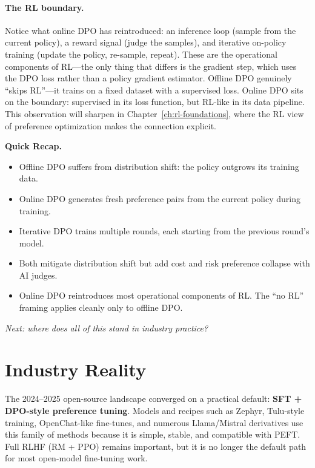 \paragraph{The RL boundary.} Notice what online DPO has reintroduced: an inference loop (sample from the current policy), a reward signal (judge the samples), and iterative on-policy training (update the policy, re-sample, repeat). These are the operational components of RL---the only thing that differs is the gradient step, which uses the DPO loss rather than a policy gradient estimator. Offline DPO genuinely ``skips RL''---it trains on a fixed dataset with a supervised loss. Online DPO sits on the boundary: supervised in its loss function, but RL-like in its data pipeline. This observation will sharpen in Chapter~\ref{ch:rl-foundations}, where the RL view of preference optimization makes the connection explicit.

\begin{quickrecap}
\textbf{Quick Recap.}
\begin{itemize}[nosep,leftmargin=1.5em]
  \item Offline DPO suffers from distribution shift: the policy outgrows its training data.
  \item Online DPO generates fresh preference pairs from the current policy during training.
  \item Iterative DPO trains multiple rounds, each starting from the previous round's model.
  \item Both mitigate distribution shift but add cost and risk preference collapse with AI judges.
  \item Online DPO reintroduces most operational components of RL. The ``no RL'' framing applies cleanly only to offline DPO.
\end{itemize}
\textit{Next: where does all of this stand in industry practice?}
\end{quickrecap}


\section{Industry Reality}
\label{sec:preference-industry}

The 2024--2025 open-source landscape converged on a practical default: \textbf{SFT + DPO-style preference tuning}. Models and recipes such as Zephyr, Tulu-style training, OpenChat-like fine-tunes, and numerous Llama/Mistral derivatives use this family of methods because it is simple, stable, and compatible with PEFT. Full RLHF (RM + PPO) remains important, but it is no longer the default path for most open-model fine-tuning work.

